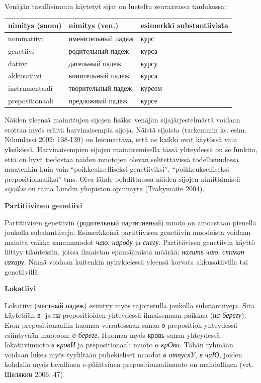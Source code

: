 \documentclass[]{scrreprt}
\begin{document}
Venäjän tavallisimmin käytetyt sijat on lueteltu seuraavassa taulukossa:

\begin{longtable}[c]{@{}lll@{}}
\toprule
nimitys (suom) & nimitys (ven.) & esimerkki
substantiivista\tabularnewline
\midrule
\endhead
nominatiivi & именительный падеж & курс\tabularnewline
genetiivi & родительный падеж & курса\tabularnewline
datiivi & дательный падеж & курсу\tabularnewline
akkusatiivi & винительный падеж & курса\tabularnewline
instrumentaali & творительный падеж & курсом\tabularnewline
prepositionaali & предложный падеж & курсе\tabularnewline
\bottomrule
\end{longtable}

Näiden yleensä mainittujen sijojen lisäksi venäjän sijajärjestelmästä
voidaan erottaa myös eräitä harvinaisempia sijoja. Näistä sijoista
(tarkemmin ks. esim. Nikunlassi 2002: 138-139) on huomattava, että ne
kaikki ovat käytössä vain yksikössä. Harvinaisempien sijojen
mainitsemisella tässä yhteydessä on se funktio, että on hyvä tiedostaa
näiden muotojen olevan selitettävissä todellisuudessa muutenkin kuin
vain ``poikkeukselliseksi genetiiviksi'', ``poikkeukselliseksi
prepositionaaliksi'' tms. Oiva lähde pohdittaessa näiden sijojen
nimittämistä \emph{sijoiksi} on
\href{http://lup.lub.lu.se/luur/download?func=downloadFile\&recordOId=3810042\&fileOId=3810043}{tämä
Lundin yliopiston opinnäyte} (Trakymaite 2004).

\textbf{Partitiivinen genetiivi}

Partitiivisen genetiivin (родительный партитивный) muoto on ainoastaan
pienellä joukolla substantiiveja. Esimerkkeinä partitiivisen genetiivin
muodoista voidaan mainita vaikka sananmuodot \emph{чаю}, \emph{народу}
ja \emph{снегу}. Partitiivisen genetiivin käyttö liittyy tilanteisiin,
joissa ilmaistan epämääräistä määrää: \emph{налить чаю}, \emph{стакан
сахару}. Nämä voidaan kuitenkin nykykielessä yleensä korvata
akkusatiivilla tai genetiivillä.

\textbf{Lokatiivi}

Lokatiivi (местный падеж) esiintyy myös rajoitetulla joukolla
substantiiveja. Sitä käytetään в- ja на-prepositioiden yhteydessä
ilmaisemaan paikkaa (\emph{на берегу}). Eron prepositionaaliin huomaa
verratessaan sanaa о-preposition yhteydessä esiintyvään muotoon: \emph{о
береге}. Huomaa myös кровь-sanan yhteydessä lokatiivimuoto \emph{в
кровИ} ja prepositionaali muoto \emph{о крОви}. Tähän ryhmään voidaan
lukea myös tyyliltään puhekieliset muodot \emph{в отпускУ}, \emph{в
чаЮ}, joiden kohdalla myös tavallinen e-päätteinen prepositionaalimuoto
on mahdollinen (vrt. Шелякин 2006: 47).
\end{document}

